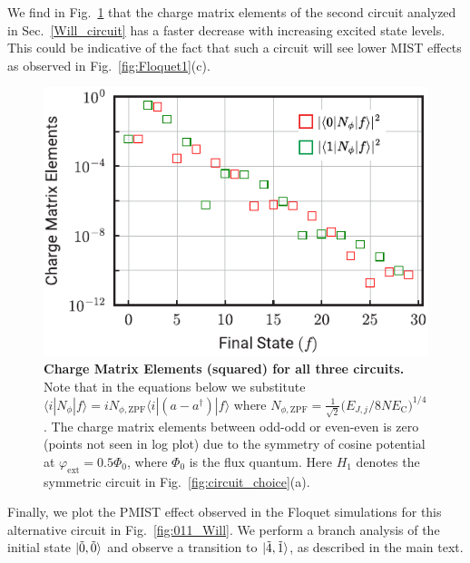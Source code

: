 \documentclass[%
reprint,
superscriptaddress,
 amsmath,amssymb,
 aps,
 prx,
longbibliography,
floatfix,
]{revtex4-2}
\begin{document}
{We find in Fig.~\ref{fig:charge-matrix-Will} that the charge matrix elements of the second circuit analyzed in Sec.~\ref{Will_circuit} has a faster decrease with increasing excited state levels. This could be indicative of the fact that such a circuit will see lower MIST effects as observed in Fig.~\ref{fig:Floquet1}(c). 
\begin{figure}[htb]
    \centering
    \includegraphics[width=\linewidth]{Supp_Fig/Charge-matrix-Will.pdf}
    \caption{{\bf Charge Matrix 
 Elements (squared) for all three circuits.} Note that in the equations below we substitute $\langle i|N_\phi|f\rangle=iN_{\phi,\mathrm{ZPF}}\langle i|(a-a^\dagger)|f\rangle$ where $N_{\phi,\mathrm{ZPF}}=\frac{1}{\sqrt{2}}\Big(E_{J,j}/8NE_{\textrm{C}}\Big)^{1/4}$. The charge matrix elements between odd-odd or even-even is zero (points not seen in log plot) due to the symmetry of cosine potential at $\varphi_\mathrm{ext}=0.5\Phi_0$, where $\Phi_0$ is the flux quantum. Here $H_1$ denotes the symmetric circuit in Fig.~\ref{fig:circuit_choice}(a).}
    \label{fig:charge-matrix-Will}
\end{figure}

Finally, we plot the PMIST effect observed in the Floquet simulations for this alternative circuit in Fig.~\ref{fig:011_Will}. We perform a branch analysis of the initial state $\ket{\tilde{0}, \tilde{0}}$ and observe a transition to $\ket{\tilde{4},\tilde{1}}$, as described in the main text. 

}
\end{document}
